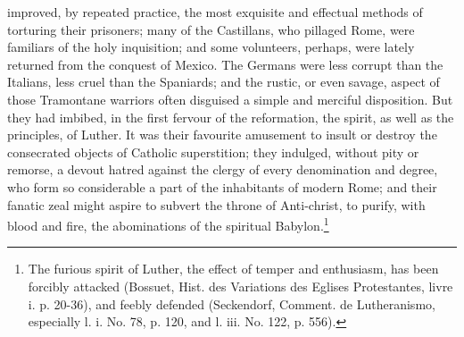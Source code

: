 improved, by repeated practice, the most exquisite and effectual methods of torturing their prisoners; many of the Castillans, who pillaged Rome, were familiars of the holy inquisition; and some volunteers, perhaps, were lately returned from the conquest of Mexico. The Germans were less corrupt than the Italians, less cruel than the Spaniards; and the rustic, or even savage, aspect of those Tramontane warriors often disguised a simple and merciful disposition. But they had imbibed, in the first fervour of the reformation, the spirit, as well as the principles, of Luther. It was their favourite amusement to insult or destroy the consecrated objects of Catholic superstition; they indulged, without pity or remorse, a devout hatred against the clergy of every denomination and degree, who form so considerable a part of the inhabitants of modern Rome; and their fanatic zeal might aspire to subvert the throne of Anti-christ, to purify, with blood and fire, the abominations of the spiritual Babylon.\footnote{The furious spirit of Luther, the effect of temper and enthusiasm, has been forcibly attacked (Bossuet, Hist. des Variations des Eglises Protestantes, livre i. p. 20-36), and feebly defended (Seckendorf, Comment. de Lutheranismo, especially l. i. No. 78, p. 120, and l. iii. No. 122, p. 556).}

